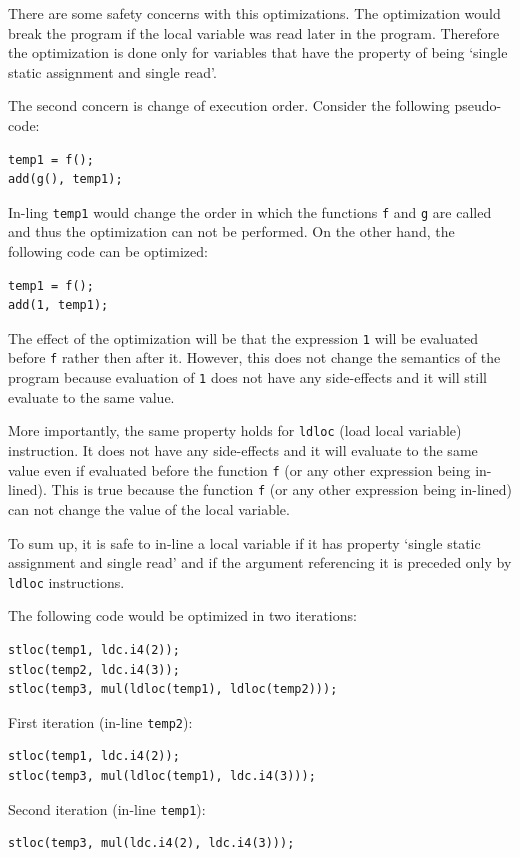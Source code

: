 \documentclass[12pt,twoside,notitlepage]{report}
\begin{document}
There are some safety concerns with this optimizations.
The optimization would break the program if the local variable
was read later in the program.
Therefore the optimization is done only for variables that have 
the property of being `single static assignment and single read'.

The second concern is change of execution order.
Consider the following pseudo-code:
\begin{verbatim}
temp1 = f();
add(g(), temp1);
\end{verbatim}
In-ling \verb|temp1| would change the order in which the
functions \verb|f| and \verb|g| are called and thus the 
optimization can not be performed.
On the other hand, the following code can be optimized:
\begin{verbatim}
temp1 = f();
add(1, temp1);
\end{verbatim}
The effect of the optimization will be that the expression
\verb|1| will be evaluated before \verb|f| rather then 
after it.  However, this does not change the semantics 
of the program because evaluation of \verb|1| does not have 
any side-effects and it will still evaluate to the same value.

More importantly, the same property holds for \verb|ldloc| (load local variable)
instruction.  It does not have any side-effects and it will 
evaluate to the same value even if evaluated before the
function \verb|f| (or any other expression being in-lined).
This is true because the function \verb|f|
(or any other expression being in-lined)
can not change the value of the local variable.  


To sum up, it is safe to in-line a local variable if it has
property `single static assignment and single read' and 
if the argument referencing it is preceded only 
by \verb|ldloc| instructions.

The following code would be optimized in two iterations:
\begin{verbatim}
stloc(temp1, ldc.i4(2));
stloc(temp2, ldc.i4(3));
stloc(temp3, mul(ldloc(temp1), ldloc(temp2)));
\end{verbatim}
First iteration (in-line \verb|temp2|):
\begin{verbatim}
stloc(temp1, ldc.i4(2));
stloc(temp3, mul(ldloc(temp1), ldc.i4(3)));
\end{verbatim}
Second iteration (in-line \verb|temp1|):
\begin{verbatim}
stloc(temp3, mul(ldc.i4(2), ldc.i4(3)));
\end{verbatim}
\end{document}
